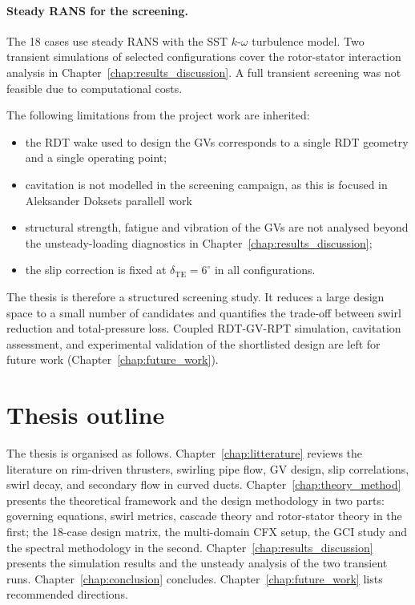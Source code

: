 \paragraph{Steady RANS for the screening.} The 18 cases use steady RANS with the SST $k$-$\omega$ turbulence model. Two transient simulations of selected configurations cover the rotor-stator interaction analysis in Chapter~\ref{chap:results_discussion}. A full transient screening was not feasible due to computational costs.

\medskip
The following limitations from the project work are inherited:
\begin{itemize}
  \item the RDT wake used to design the GVs corresponds to a single RDT geometry and a single operating point;
  \item cavitation is not modelled in the screening campaign, as this is focused in Aleksander Doksets parallell work %
  \item structural strength, fatigue and vibration of the GVs are not analysed beyond the unsteady-loading diagnostics in Chapter~\ref{chap:results_discussion};
  \item the slip correction is fixed at $\delta_{\mathrm{TE}} = 6^\circ$ in all configurations.
\end{itemize}

The thesis is therefore a structured screening study. It reduces a large design space to a small number of candidates and quantifies the trade-off between swirl reduction and total-pressure loss. Coupled RDT-GV-RPT simulation, cavitation assessment, and experimental validation of the shortlisted design are left for future work (Chapter~\ref{chap:future_work}).

\section{Thesis outline} %
\label{sec:thesis_outline}

The thesis is organised as follows. Chapter~\ref{chap:litterature} reviews the literature on rim-driven thrusters, swirling pipe flow, GV design, slip correlations, swirl decay, and secondary flow in curved ducts. Chapter~\ref{chap:theory_method} presents the theoretical framework and the design methodology in two parts: governing equations, swirl metrics, cascade theory and rotor-stator theory in the first; the 18-case design matrix, the multi-domain CFX setup, the GCI study and the spectral methodology in the second. Chapter~\ref{chap:results_discussion} presents the simulation results and the unsteady analysis of the two transient runs. Chapter~\ref{chap:conclusion} concludes. Chapter~\ref{chap:future_work} lists recommended directions.

\clearpage